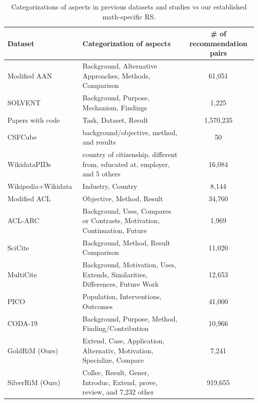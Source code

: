 \documentclass[sigconf,anonymous]{acmart}
\begin{document}
\begin{table}[h]
\centering
\caption{Categorizations of aspects in previous datasets and studies vs our established math-specific RS.}
\label{tab:aspects}
\begin{tabular}{llc}
\hline
Dataset & Categorization of aspects & \# of recommendation pairs\\
\hline
Modified AAN~\cite{chakraborty2016ferosa} & Background, Alternative Approaches, Methods, Comparison & 61,051\\
SOLVENT~\cite{chan2018solventCSCW} & Background, Purpose, Mechanism, Findings & 1,225\\
Papers with code~\cite{2020PapWitCodeData} & Task, Dataset, Result & 1,570,235\\
CSFCube~\cite{mysore2021csfcube} & background/objective, method, and results & 50 \\
WikidataPIDs~\cite{2020OstendorffWiki} & country of citizenship, different from, educated at, employer, and 5 others & 16,084\\ 
Wikipedia+Wikidata~\cite{2023aspectcse} & Industry, Country & 8,144\\
\hdashline
Modified ACL~\cite{kobayashi2018ACL} & Objective, Method, Result & 34,760\\
ACL-ARC~\cite{Jurgens2018ACLARC} & Background, Uses, Compares or Contrasts, Motivation, Continuation, Future & 1,969\\
SciCite~\cite{cohan2019structural} & Background, Method, Result Comparison & 11,020\\
MultiCite~\cite{2022multicite} & Background, Motivation, Uses, Extends, Similarities, Differences, Future Work & 12,653\\
\hdashline
PICO~\cite{jain2018PICObiomed} & Population, Interventions, Outcomes & 41,000\\
CODA-19~\cite{huang2020coda} & Background, Purpose, Method, Finding/Contribution & 10,966\\ 
\hline
GoldRiM (Ours)& Extend, Case, Application, Alternativ, Motivation, Specialize, Compare & 7,241\\
SilverRiM (Ours)& Collec, Result,  Gener, Introduc, Extend, prove, review, and 7,232 other & 919,655\\
\hline
\end{tabular}
\end{table}
\end{document}
